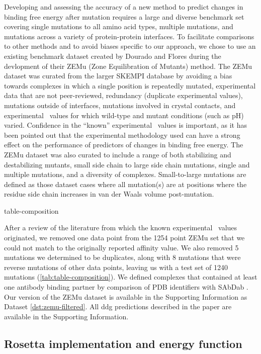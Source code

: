 Developing and assessing the accuracy of a new method to predict changes in binding free energy after mutation requires a large and diverse benchmark set covering single mutations to all amino acid types, multiple mutations, and mutations across a variety of protein-protein interfaces.
To facilitate comparisons to other methods and to avoid biases specific to our approach, we chose to use an existing benchmark dataset created by Dourado and Flores\cite{dourado_multiscale_2014} during the devlopment of their ZEMu (Zone Equilibration of Mutants) method.
The ZEMu dataset was curated from the larger SKEMPI database\cite{moal_skempi:_2012} by avoiding a bias towards complexes in which a single position is repeatedly mutated, experimental data that are not peer-reviewed, redundancy (duplicate experimental values), mutations outside of interfaces, mutations involved in crystal contacts, and experimental \ddg\ values for which wild-type and mutant conditions (such as pH) varied.
Confidence in the ``known'' experimental \ddg\ values is important, as it has been pointed out that the experimental methodology used can have a strong effect on the performance of predictors of changes in binding free energy\cite{geng_exploring_2016}.
The ZEMu dataset was also curated to include a range of both stabilizing and destabilizing mutants, small side chain to large side chain mutations, single and multiple mutations, and a diversity of complexes.
Small-to-large mutations are defined as those dataset cases where all mutation(s) are at positions where the residue side chain increases in van der Waals volume post-mutation.

{table-composition}

After a review of the literature from which the known experimental \ddg\ values originated, we removed one data point from the 1254 point ZEMu set that we could not match to the originally reported affinity value. We also removed 5 mutations we determined to be duplicates, along with 8 mutations that were reverse mutations of other data points, leaving us with a test set of 1240 mutations (\cref{tab:table-composition}).
We defined complexes that contained at least one antibody binding partner by comparison of PDB identifiers with SAbDab \cite{dunbar_sabdab:_2014}.
Our version of the ZEMu dataset is available in the Supporting Information as Dataset \ref{dst:zemu-filtered}.
All ddg predictions described in the paper are available in the Supporting Information.

\subsection{Rosetta implementation and energy function}

